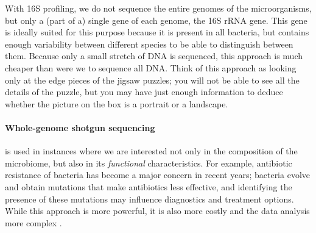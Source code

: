 \begin{justify}
With 16S profiling, we do not sequence the entire genomes of the microorganisms, but only a (part of a) single gene of each genome, the 16S rRNA gene. This gene is ideally suited for this purpose because it is present in all bacteria, but contains enough variability between different species to be able to distinguish between them. Because only a small stretch of DNA is sequenced, this approach is much cheaper than were we to sequence all DNA\@. Think of this approach as looking only at the edge pieces of the jigsaw puzzles; you will not be able to see all the details of the puzzle, but you may have just enough information to deduce whether the picture on the box is a portrait or a landscape.


\paragraph{Whole-genome shotgun sequencing} is used in instances where we are interested not only in the composition of the microbiome, but also in its \emph{functional} characteristics. For example, antibiotic resistance of bacteria has become a major concern in recent years; bacteria evolve and obtain mutations that make antibiotics less effective, and identifying the presence of these mutations may influence diagnostics and treatment options. While this approach is more powerful, it is also more costly and the data analysis more complex \cite{ranjan2016analysis}.


\end{justify}
